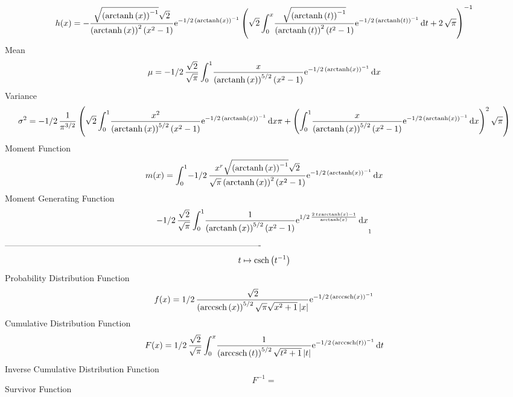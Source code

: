 \documentclass[12pt]{article}
\begin{document}
 $$ h(x)=-{\frac {\sqrt { \left( {\rm arctanh} \left(x\right) \right) ^{-1}}
\sqrt {2}}{ \left( {\rm arctanh} \left(x\right) \right) ^{2} \left( {x
}^{2}-1 \right) }{{\rm e}^{-1/2\, \left( {\rm arctanh} \left(x\right)
 \right) ^{-1}}} \left( \sqrt {2}\int_{0}^{x}\!{\frac {\sqrt { \left( 
{\rm arctanh} \left(t\right) \right) ^{-1}}}{ \left( {\rm arctanh} 
\left(t\right) \right) ^{2} \left( {t}^{2}-1 \right) }{{\rm e}^{-1/2\,
 \left( {\rm arctanh} \left(t\right) \right) ^{-1}}}}\,{\rm d}t+2\,
\sqrt {\pi} \right) ^{-1}}
$$Mean 
 $$ \mu=-1/2\,{\frac {\sqrt {2}}{\sqrt {\pi}}\int_{0}^{1}\!{\frac {x}{ \left( 
{\rm arctanh} \left(x\right) \right) ^{5/2} \left( {x}^{2}-1 \right) }
{{\rm e}^{-1/2\, \left( {\rm arctanh} \left(x\right) \right) ^{-1}}}}
\,{\rm d}x}
$$ Variance 
 $$ \sigma^2 = -1/2\,{\frac {1}{{\pi}^{3/2}} \left( \sqrt {2}\int_{0}^{1}\!{\frac {{x
}^{2}}{ \left( {\rm arctanh} \left(x\right) \right) ^{5/2} \left( {x}^
{2}-1 \right) }{{\rm e}^{-1/2\, \left( {\rm arctanh} \left(x\right)
 \right) ^{-1}}}}\,{\rm d}x\pi+ \left( \int_{0}^{1}\!{\frac {x}{
 \left( {\rm arctanh} \left(x\right) \right) ^{5/2} \left( {x}^{2}-1
 \right) }{{\rm e}^{-1/2\, \left( {\rm arctanh} \left(x\right)
 \right) ^{-1}}}}\,{\rm d}x \right) ^{2}\sqrt {\pi} \right) }
$$Moment Function 
 $$ m(x) = \int_{0}^{1}\!-1/2\,{\frac {{x}^{r}\sqrt { \left( {\rm arctanh} \left(
x\right) \right) ^{-1}}\sqrt {2}}{\sqrt {\pi} \left( {\rm arctanh} 
\left(x\right) \right) ^{2} \left( {x}^{2}-1 \right) }{{\rm e}^{-1/2\,
 \left( {\rm arctanh} \left(x\right) \right) ^{-1}}}}\,{\rm d}x
$$ Moment Generating Function 
 $$-1/2\,{\frac {\sqrt {2}}{\sqrt {\pi}}\int_{0}^{1}\!{\frac {1}{ \left( 
{\rm arctanh} \left(x\right) \right) ^{5/2} \left( {x}^{2}-1 \right) }
{{\rm e}^{1/2\,{\frac {2\,tx{\rm arctanh} \left(x\right)-1}{
{\rm arctanh} \left(x\right)}}}}}\,{\rm d}x}_{{1}}
$$-------------------------------------------------------------------------------------------  \\$$t\mapsto {\rm csch} \left({t}^{-1}\right)
$$Probability Distribution Function 
$$  f(x)=1/2\,{\frac {\sqrt {2}}{ \left( {\rm arccsch} \left(x\right) \right) ^
{5/2}\sqrt {\pi}\sqrt {{x}^{2}+1} \left| x \right| }{{\rm e}^{-1/2\,
 \left( {\rm arccsch} \left(x\right) \right) ^{-1}}}}
$$Cumulative Distribution Function  
 $$F(x)=1/2\,{\frac {\sqrt {2}}{\sqrt {\pi}}\int_{0}^{x}\!{\frac {1}{ \left( 
{\rm arccsch} \left(t\right) \right) ^{5/2}\sqrt {{t}^{2}+1} \left| t
 \right| }{{\rm e}^{-1/2\, \left( {\rm arccsch} \left(t\right)
 \right) ^{-1}}}}\,{\rm d}t}
$$ Inverse Cumulative Distribution Function 
  $$F^{-1} = $$Survivor Function 
\end{document}
